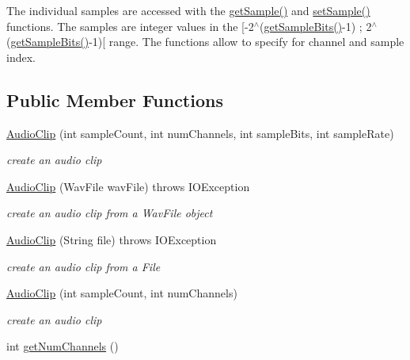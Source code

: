 The individual samples are accessed with the \hyperlink{classbridges_1_1base_1_1_audio_clip_a0db520ed7ad301161e03a55b783856f8}{get\+Sample()} and \hyperlink{classbridges_1_1base_1_1_audio_clip_a896e82f2788b319569c4f0e8f919ffc9}{set\+Sample()} functions. The samples are integer values in the \mbox{[}-\/2$^\wedge$(\hyperlink{classbridges_1_1base_1_1_audio_clip_a59e5a3f38768e52c15e43b5679f3f09c}{get\+Sample\+Bits()}-\/1) ; 2$^\wedge$(\hyperlink{classbridges_1_1base_1_1_audio_clip_a59e5a3f38768e52c15e43b5679f3f09c}{get\+Sample\+Bits()}-\/1)\mbox{[} range. The functions allow to specify for channel and sample index. \subsection*{Public Member Functions}
\begin{DoxyCompactItemize}
\item 
\hyperlink{classbridges_1_1base_1_1_audio_clip_a83e87997fd53dbcbde7680b90c1ff3f2}{Audio\+Clip} (int sample\+Count, int num\+Channels, int sample\+Bits, int sample\+Rate)
\begin{DoxyCompactList}\small\item\em create an audio clip \end{DoxyCompactList}\item 
\hyperlink{classbridges_1_1base_1_1_audio_clip_aece4ed61f09688a54e636ce3dc206239}{Audio\+Clip} (Wav\+File wav\+File)  throws I\+O\+Exception 
\begin{DoxyCompactList}\small\item\em create an audio clip from a Wav\+File object \end{DoxyCompactList}\item 
\hyperlink{classbridges_1_1base_1_1_audio_clip_a70d5f6f10dad6da2f27bb04b7021e2fa}{Audio\+Clip} (String file)  throws I\+O\+Exception 
\begin{DoxyCompactList}\small\item\em create an audio clip from a File \end{DoxyCompactList}\item 
\hyperlink{classbridges_1_1base_1_1_audio_clip_aca2a5258c29b104bf8216ae5ec3c5938}{Audio\+Clip} (int sample\+Count, int num\+Channels)
\begin{DoxyCompactList}\small\item\em create an audio clip \end{DoxyCompactList}\item 
int \hyperlink{classbridges_1_1base_1_1_audio_clip_a09e8b5da5249851f7583e910f24b0395}{get\+Num\+Channels} ()

\end{DoxyCompactItemize}
